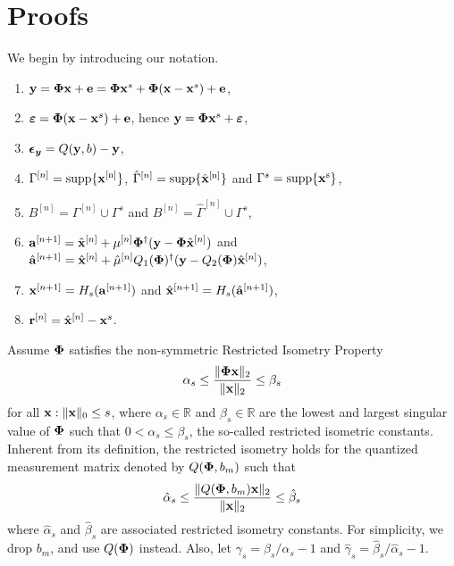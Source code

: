 \documentclass[aoas,preprint]{imsart}
\numberwithin{equation}{section}
\theoremstyle{plain}
\begin{document}
{\section*{Proofs}
We begin by introducing our notation.
\begin{enumerate}
    \item ${\bf y} = {\bf \Phi} {\bf x} + {\bf e} = {\bf \Phi} {\bf x}^s + {\bf \Phi}({\bf x}-{\bf x}^s) + {\bf e}$,
    \item $\boldsymbol{\varepsilon} = {\bf \Phi}({\bf x}-{\bf x}^s) + {\bf e}$, hence ${\bf y} = {\bf \Phi} {\bf x}^s + \boldsymbol{\varepsilon}$,
    \item $\boldsymbol{\epsilon_y} = Q({\bf y},b) - {\bf y}$,
    \item $\Gamma^{[n]} = \rm{supp}\{{\bf x}^{[n]} \}$, $\hat{\Gamma}^{[n]} = \rm{supp}\{\hat{{\bf x}}^{[n]} \}$ and $\Gamma^{s} = \rm{supp}\{{\bf x}^{s} \}$,
    \item $B^{[n]} = \Gamma^{[n]} \cup \Gamma^{s}$ and $B^{[n]} = \hat{\Gamma}^{[n]} \cup \Gamma^{s}$,
    \item ${\bf a}^{[n+1]} = \hat{{\bf x}}^{[n]} + \mu^{[n]}{\bf \Phi}^{\dag}({\bf y} - {\bf \Phi}\hat{{\bf x}}^{[n]})$ and $\hat{{\bf a}}^{[n+1]} = \hat{{\bf x}}^{[n]} + \hat{\mu}^{[n]}Q_{1}({\bf \Phi})^{\dag}({\bf y} - Q_2({\bf \Phi})\hat{{\bf x}}^{[n]})$,
    \item ${\bf x}^{[n+1]} = H_s({\bf a}^{[n+1]})$ and $\hat{{\bf x}}^{[n+1]} = H_s(\hat{{\bf a}}^{[n+1]})$,
    \item ${\bf r}^{[n]} = \hat{{\bf x}}^{[n]}-{\bf x}^s$.
\end{enumerate}
Assume $\mathbf{\bf \Phi}$ satisfies the non-symmetric Restricted Isometry Property 
\begin{equation}\label{rip}
\alpha_{s} \leq \frac{\|{\bf {\bf \Phi}} {\bf x}\|_2}{\|{\bf x}\|_2} \leq \beta_{s}
\end{equation}
for all ${\bf x}: \|{\bf x}\|_0 \leq s$, where $\alpha_s\in \mathbb{R}$ and $\beta_s \in \mathbb{R}$ are the lowest and largest singular value of ${\bf \Phi}$ such that $0<\alpha_s\leq \beta_s$, the so-called restricted isometric constants. Inherent from its definition, the restricted isometry holds for the quantized measurement matrix denoted by $Q({\bf {\bf \Phi}}, b_m)$ such that
\begin{equation}\label{rip_lowprecision}
\hat{\alpha}_{s} \leq \frac{\|Q({\bf {\bf \Phi}}, b_m) {\bf x}\|_2}{\|{\bf x}\|_2} \leq \hat{\beta}_{s}
\end{equation}
where $\hat{\alpha}_{s}$ and $\hat{\beta}_{s}$ are associated restricted isometry constants. For simplicity, we drop $b_m$, and use $Q({\bf {\bf \Phi}})$ instead. Also, let $\gamma_s=\beta_s/\alpha_s-1$ and $\hat{\gamma}_s=\hat{\beta}_s/\hat{\alpha}_s-1$.

}
\end{document}
